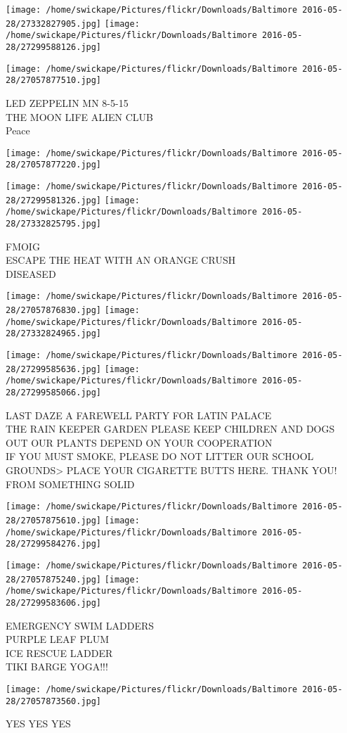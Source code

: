 \documentclass[10pt,letterpaper]{article}
\begin{document}
\texttt{[image: /home/swickape/Pictures/flickr/Downloads/Baltimore 2016-05-28/27332827905.jpg]}
\texttt{[image: /home/swickape/Pictures/flickr/Downloads/Baltimore 2016-05-28/27299588126.jpg]}

\texttt{[image: /home/swickape/Pictures/flickr/Downloads/Baltimore 2016-05-28/27057877510.jpg]}

LED ZEPPELIN MN 8{-}5{-}15\\
THE MOON LIFE ALIEN CLUB\\
Peace
\pagebreak

\texttt{[image: /home/swickape/Pictures/flickr/Downloads/Baltimore 2016-05-28/27057877220.jpg]}

\vspace{0.25in}
\texttt{[image: /home/swickape/Pictures/flickr/Downloads/Baltimore 2016-05-28/27299581326.jpg]}
\texttt{[image: /home/swickape/Pictures/flickr/Downloads/Baltimore 2016-05-28/27332825795.jpg]}

FMOIG\\
ESCAPE THE HEAT WITH AN ORANGE CRUSH\\
DISEASED
\pagebreak

\texttt{[image: /home/swickape/Pictures/flickr/Downloads/Baltimore 2016-05-28/27057876830.jpg]}
\texttt{[image: /home/swickape/Pictures/flickr/Downloads/Baltimore 2016-05-28/27332824965.jpg]}

\texttt{[image: /home/swickape/Pictures/flickr/Downloads/Baltimore 2016-05-28/27299585636.jpg]}
\texttt{[image: /home/swickape/Pictures/flickr/Downloads/Baltimore 2016-05-28/27299585066.jpg]}

LAST DAZE A FAREWELL PARTY FOR LATIN PALACE\\
THE RAIN KEEPER GARDEN PLEASE KEEP CHILDREN AND DOGS OUT OUR PLANTS DEPEND ON YOUR COOPERATION\\
IF YOU MUST SMOKE, PLEASE DO NOT LITTER OUR SCHOOL GROUNDS>  PLACE YOUR CIGARETTE BUTTS HERE.  THANK YOU!\\
FROM SOMETHING SOLID
\pagebreak

\texttt{[image: /home/swickape/Pictures/flickr/Downloads/Baltimore 2016-05-28/27057875610.jpg]}
\texttt{[image: /home/swickape/Pictures/flickr/Downloads/Baltimore 2016-05-28/27299584276.jpg]}

\texttt{[image: /home/swickape/Pictures/flickr/Downloads/Baltimore 2016-05-28/27057875240.jpg]}
\texttt{[image: /home/swickape/Pictures/flickr/Downloads/Baltimore 2016-05-28/27299583606.jpg]}

EMERGENCY SWIM LADDERS\\
PURPLE LEAF PLUM\\
ICE RESCUE LADDER\\
TIKI BARGE YOGA!!!
\pagebreak

\texttt{[image: /home/swickape/Pictures/flickr/Downloads/Baltimore 2016-05-28/27057873560.jpg]}

YES YES YES
\pagebreak
\end{document}
